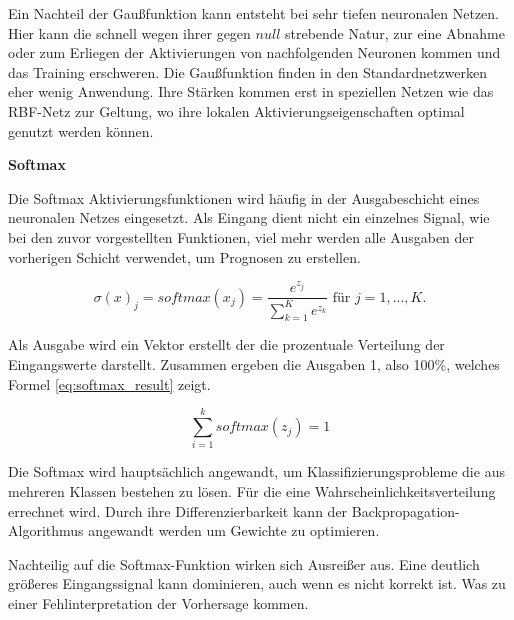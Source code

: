 Ein Nachteil der Gaußfunktion kann entsteht bei sehr tiefen neuronalen Netzen. Hier kann die schnell wegen ihrer gegen $null$ strebende Natur, zur eine Abnahme oder zum Erliegen der Aktivierungen von nachfolgenden Neuronen kommen und das Training erschweren. Die Gaußfunktion finden in den Standardnetzwerken eher wenig Anwendung. Ihre Stärken kommen erst in speziellen Netzen wie das RBF-Netz zur Geltung, wo ihre lokalen Aktivierungseigenschaften optimal genutzt werden können.\vspace{0.2cm}

%
\textbf{Softmax}\vspace{0.2cm}


Die Softmax Aktivierungsfunktionen wird häufig in der Ausgabeschicht eines neuronalen Netzes eingesetzt. Als Eingang dient nicht ein einzelnes Signal, wie bei den zuvor vorgestellten Funktionen, viel mehr werden alle Ausgaben der vorherigen Schicht verwendet, um Prognosen zu erstellen.

\begin{equation}\label{eq:softmax_function}
	\sigma (x)_{j} = softmax(x_{j}) = \frac{e^{z_{j}}}{\sum_{k=1}^{K} e^{z_{k}}} \text{ für } j = 1, ..., K.
\end{equation}

Als Ausgabe wird ein Vektor erstellt der die prozentuale Verteilung der Eingangswerte darstellt. Zusammen ergeben die Ausgaben 1, also 100\%, welches Formel \ref{eq:softmax_result} zeigt.

\begin{equation}\label{eq:softmax_result}
	\sum_{i=1}^{k} softmax(z_{j}) = 1
\end{equation}

Die Softmax wird hauptsächlich angewandt, um Klassifizierungsprobleme die aus mehreren Klassen bestehen zu lösen. Für die eine Wahrscheinlichkeitsverteilung errechnet wird. Durch ihre Differenzierbarkeit kann der Backpropagation-Algorithmus angewandt werden um Gewichte zu optimieren.\vspace{0.2cm}

Nachteilig auf die Softmax-Funktion wirken sich Ausreißer aus. Eine deutlich größeres Eingangssignal kann dominieren, auch wenn es nicht korrekt ist. Was zu einer Fehlinterpretation der Vorhersage kommen.

